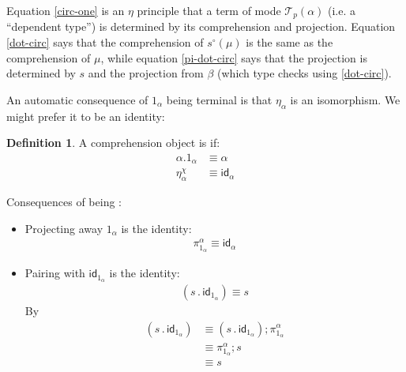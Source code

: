 \documentclass[10pt]{article}
\theoremstyle{definition}
\newtheorem{definition}{Definition}
\newcommand{\id}{\mathsf{id}}
\newcommand\El[2]{\mathcal{T}_{#1}(#2)}
\newcommand\bdot[0]{\mathbin{.}}
\begin{document}
Equation \eqref{circ-one} is an $\eta$ principle that a term of mode
$\El{p}{\alpha}$ (i.e. a ``dependent type'') is determined by its
comprehension and projection. Equation \eqref{dot-circ} says
that the comprehension of $s^\circ(\mu)$ is the same as the
comprehension of $\mu$, while equation \eqref{pi-dot-circ} says that the
projection is determined by $s$ and the projection from $\beta$ (which
type checks using \eqref{dot-circ}).

An automatic consequence of $1_\alpha$ being terminal is that $\eta_\alpha$ is an isomorphism. We might prefer it to be an identity:

\begin{definition}
  A comprehension object is  if:
\begin{align}
\label{dot-one-strict}
\alpha.1_{\alpha} &\equiv \alpha\\
\label{chi-unit-identity}
\eta^\chi_\alpha &\equiv \id_\alpha
\end{align}
\end{definition}
Consequences of being :
\begin{itemize}
\item Projecting away $1_\alpha$ is the identity:
\begin{align}
\label{pi-one-strict}
\pi^\alpha_{1_\alpha} \equiv \id_\alpha 
\end{align}
\item Pairing with $\id_{1_\alpha}$ is the identity:
\begin{align}
\label{pair-s-bang}
(s \bdot \id_{1_\alpha}) \equiv s
\end{align}
By
\begin{align*}
(s \bdot \id_{1_\alpha}) 
&\equiv (s \bdot \id_{1_\alpha}); \pi^\alpha_{1_\alpha} \\
&\equiv \pi^\alpha_{1_\alpha};s \\
&\equiv s
\end{align*}
\end{itemize}
\end{document}
